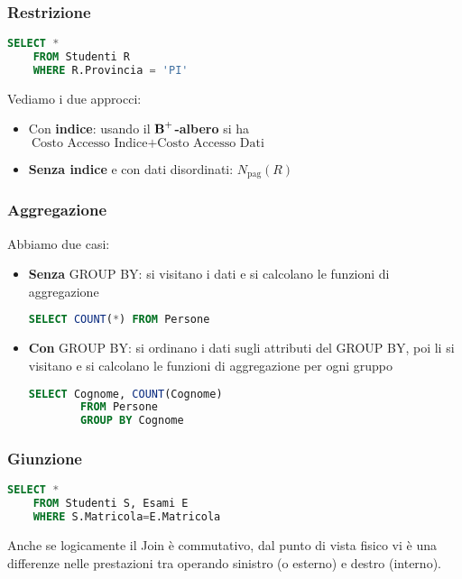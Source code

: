 \subsubsection{Restrizione}
\begin{lstlisting}[language=SQL]
	SELECT *
	FROM Studenti R
	WHERE R.Provincia = 'PI'
\end{lstlisting}
Vediamo i due approcci:
\begin{itemize}
	\item Con \textbf{indice}: usando il $\text{\textbf{B}}^+$\textbf{-albero} si ha $\text{Costo Accesso Indice} + \text{Costo Accesso Dati}$
	\item \textbf{Senza indice} e con dati disordinati: $N_{\text{pag}}(R)$
\end{itemize}

\subsubsection{Aggregazione}
Abbiamo due casi:
\begin{itemize}
	\item \textbf{Senza} GROUP BY: si visitano i dati e si calcolano le funzioni di aggregazione
	\begin{lstlisting}[language=SQL]
		SELECT COUNT(*) FROM Persone
	\end{lstlisting}
	\item \textbf{Con} GROUP BY: si ordinano i dati sugli attributi del GROUP BY, poi li si visitano e si
	calcolano le funzioni di aggregazione per ogni gruppo
	\begin{lstlisting}[language=SQL]
		SELECT Cognome, COUNT(Cognome)
		FROM Persone
		GROUP BY Cognome
	\end{lstlisting}
\end{itemize}

\subsubsection{Giunzione}
\begin{lstlisting}[language=SQL]
	SELECT *
	FROM Studenti S, Esami E
	WHERE S.Matricola=E.Matricola
\end{lstlisting}
Anche se logicamente il Join è commutativo, dal punto di vista fisico vi è una differenze nelle prestazioni tra operando sinistro (o esterno) e destro (interno).

